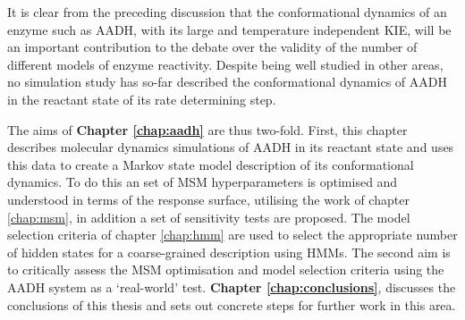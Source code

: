 It is clear from the preceding discussion that the conformational dynamics of an enzyme such as AADH, with its large and temperature independent KIE, will be an important contribution to the debate over the validity of the number of different models of enzyme reactivity. Despite being well studied in other areas, no simulation study has so-far described the conformational dynamics of AADH in the reactant state of its rate determining step.  

The aims of \textbf{Chapter \ref{chap:aadh}} are thus two-fold.  First, this chapter describes molecular dynamics simulations of AADH in its reactant state and uses this data to create a Markov state model description of its conformational dynamics. To do this an  set of MSM hyperparameters is optimised and understood in terms of the response surface, utilising the work of chapter \ref{chap:msm}, in addition a set of sensitivity tests are proposed. The model selection criteria of chapter \ref{chap:hmm} are used to select the appropriate number of hidden states for a coarse-grained description using HMMs. The second aim is to critically assess the MSM optimisation and model selection criteria  using the AADH system as a `real-world' test. \textbf{Chapter \ref{chap:conclusions}}, discusses the conclusions of this thesis and sets out concrete steps for further work in this area. 















